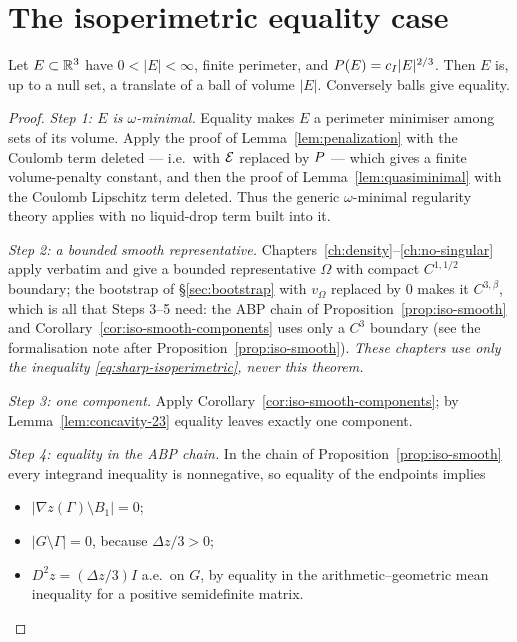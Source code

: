 \chapter{The isoperimetric equality case}\label{ch:rigidity}

\begin{theorem}\label{thm:isoperimetric-rigidity}
Let $E\subset\mathbb R^3$ have $0<|E|<\infty$, finite perimeter, and
$P(E)=c_I|E|^{2/3}$.  Then $E$ is, up to a null set, a translate of a ball
of volume $|E|$.  Conversely balls give equality.
\end{theorem}

\begin{proof}
\emph{Step 1: $E$ is $\omega$-minimal.}  Equality makes $E$ a perimeter
minimiser among sets of its volume.  Apply the proof of
Lemma~\ref{lem:penalization} with the Coulomb term deleted --- i.e.\ with
$\mathcal E$ replaced by $P$ --- which gives a finite volume-penalty constant, and
then the proof of Lemma~\ref{lem:quasiminimal} with the Coulomb Lipschitz term
deleted.  Thus the generic $\omega$-minimal regularity theory applies with no
liquid-drop term built into it.

\emph{Step 2: a bounded smooth representative.}
Chapters~\ref{ch:density}--\ref{ch:no-singular} apply verbatim and give a
bounded representative $\Omega$ with compact $C^{1,1/2}$ boundary; the
bootstrap of \S\ref{sec:bootstrap} with $v_\Omega$ replaced by $0$ makes it
$C^{3,\beta}$, which is all that Steps 3--5 need: the ABP chain of
Proposition~\ref{prop:iso-smooth} and Corollary~\ref{cor:iso-smooth-components}
uses only a $C^3$ boundary (see the formalisation note after
Proposition~\ref{prop:iso-smooth}).  \emph{These chapters use only the inequality
\eqref{eq:sharp-isoperimetric}, never this theorem.}

\emph{Step 3: one component.}  Apply
Corollary~\ref{cor:iso-smooth-components}; by
Lemma~\ref{lem:concavity-23} equality leaves exactly one component.

\emph{Step 4: equality in the ABP chain.}  In the chain of
Proposition~\ref{prop:iso-smooth} every integrand inequality is nonnegative,
so equality of the endpoints implies
\begin{itemize}[nosep]
\item $|\nabla z(\Gamma)\setminus B_1|=0$;
\item $|G\setminus\Gamma|=0$, because $\Delta z/3>0$;
\item $D^2z=(\Delta z/3)I$ a.e.\ on $G$, by equality in the
  arithmetic--geometric mean inequality for a positive semidefinite matrix.
\end{itemize}


\end{proof}
